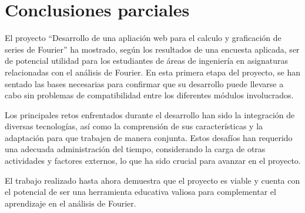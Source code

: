 \chapter{Conclusiones parciales}\label{ch:conclusiones}
El proyecto ``Desarrollo de una apliación web para el calculo y graficación de series de Fourier'' ha mostrado, según los resultados de una encuesta aplicada, ser de potencial utilidad para los estudiantes de áreas de ingeniería en asignaturas relacionadas con el análisis de Fourier. En esta primera etapa del proyecto, se han sentado las bases necesarias para confirmar que su desarrollo puede llevarse a cabo sin problemas de compatibilidad entre los diferentes módulos involucrados.
\newline

Los principales retos enfrentados durante el desarrollo han sido la integración de diversas tecnologías, así como la comprensión de sus características y la adaptación para que trabajen de manera conjunta. Estos desafíos han requerido una adecuada administración del tiempo, considerando la carga de otras actividades y factores externos, lo que ha sido crucial para avanzar en el proyecto.
\newline

El trabajo realizado hasta ahora demuestra que el proyecto es viable y cuenta con el potencial de ser una herramienta educativa valiosa para complementar el aprendizaje en el análisis de Fourier.
\newline